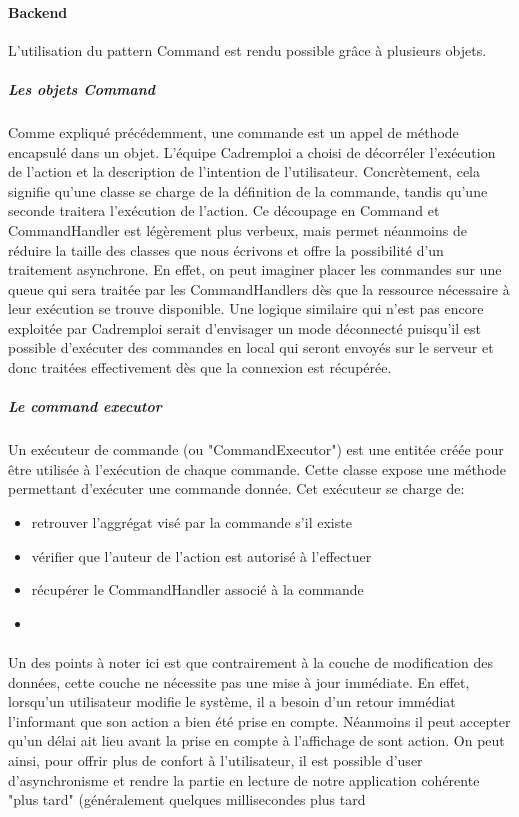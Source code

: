 \paragraph{Backend}
\label{par:Backend}
L'utilisation du pattern Command est rendu possible grâce à plusieurs objets.
\subparagraph{Les objets Command}
\label{subp:Les objets Command}
Comme expliqué précédemment, une commande est un appel de méthode encapsulé dans un objet.
L'équipe Cadremploi a choisi de décorréler l'exécution de l'action et la description de l'intention de l'utilisateur.
Concrètement, cela signifie qu'une classe se charge de la définition de la commande, tandis qu'une seconde traitera l'exécution de l'action.
Ce découpage en Command et CommandHandler est légèrement plus verbeux, mais permet néanmoins de réduire la taille des classes que nous écrivons et offre la possibilité d'un traitement asynchrone.
En effet, on peut imaginer placer les commandes sur une queue qui sera traitée par les CommandHandlers dès que la ressource nécessaire à leur exécution se trouve disponible.
Une logique similaire qui n'est pas encore exploitée par Cadremploi serait d'envisager un mode déconnecté puisqu'il est possible d'exécuter des commandes en local qui seront envoyés sur le serveur et donc traitées effectivement dès que la connexion est récupérée.

\subparagraph{Le command executor}
\label{subp:Le command executor}
Un exécuteur de commande (ou "CommandExecutor") est une entitée créée pour être utilisée à l'exécution de chaque commande.
Cette classe expose une méthode permettant d'exécuter une commande donnée.
Cet exécuteur se charge de:
\begin{itemize}
  \item retrouver l'aggrégat visé par la commande s'il existe
  \item vérifier que l'auteur de l'action est autorisé à l'effectuer
  \item récupérer le CommandHandler associé à la commande
  \item
\end{itemize}


\paragraph{} %
Un des points à noter ici est que contrairement à la couche de modification des données, cette couche ne nécessite pas une mise à jour immédiate.
En effet, lorsqu'un utilisateur modifie le système, il a besoin d'un retour immédiat l'informant que son action a bien été prise en compte.
Néanmoins il peut accepter qu'un délai ait lieu avant la prise en compte à l'affichage de sont action.
On peut ainsi, pour offrir plus de confort à l'utilisateur, il est possible d'user d'asynchronisme et rendre la partie en lecture de notre application cohérente "plus tard" (généralement quelques millisecondes plus tard
